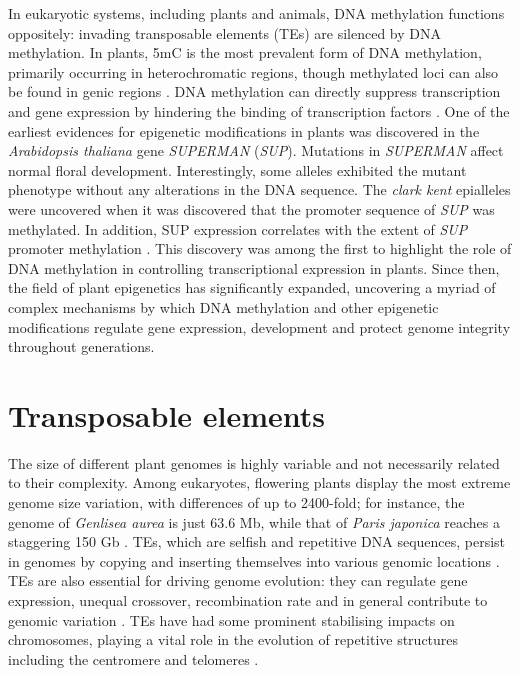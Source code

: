 In eukaryotic systems, including plants and animals, DNA methylation functions oppositely: invading transposable elements (TEs) are silenced by DNA methylation. In plants, 5mC is the most prevalent form of DNA methylation, primarily occurring in heterochromatic regions, though methylated loci can also be found in genic regions \cite{RN228,RN193}. DNA methylation can directly suppress transcription and gene expression by hindering the binding of transcription factors \cite{RN290}. One of the earliest evidences for epigenetic modifications in plants was discovered in the \textit{Arabidopsis thaliana} gene \textit{SUPERMAN} (\textit{SUP}). Mutations in \textit{SUPERMAN} affect normal floral development. Interestingly, some alleles exhibited the mutant phenotype without any alterations in the DNA sequence. The \textit{clark kent} epialleles were uncovered when it was discovered that the promoter sequence of \textit{SUP} was methylated. In addition, SUP expression correlates with the extent of \textit{SUP} promoter methylation \cite{RN100}. This discovery was among the first to highlight the role of DNA methylation in controlling transcriptional expression in plants. Since then, the field of plant epigenetics has significantly expanded, uncovering a myriad of complex mechanisms by which DNA methylation and other epigenetic modifications regulate gene expression, development and protect genome integrity throughout generations.

\section{Transposable elements} %

The size of different plant genomes is highly variable and not necessarily related to their complexity. Among eukaryotes, flowering plants display the most extreme genome size variation, with differences of up to 2400-fold; for instance, the genome of \textit{Genlisea aurea} is just 63.6 Mb, while that of \textit{Paris japonica} reaches a staggering 150 Gb \cite{RN76,RN81}. TEs, which are selfish and repetitive DNA sequences, persist in genomes by copying and inserting themselves into various genomic locations \cite{RN102}. TEs are also essential for driving genome evolution: they can regulate gene expression, unequal crossover, recombination rate and in general contribute to genomic variation \cite{RN103}. TEs have had some prominent stabilising impacts on  chromosomes, playing a vital role in the evolution  of repetitive structures including the centromere  and telomeres \cite{RN101}.

